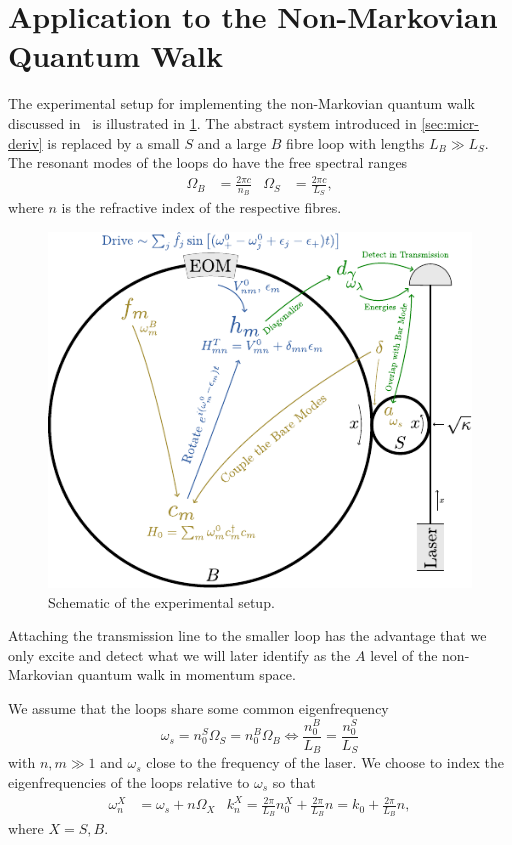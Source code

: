 \documentclass[fontsize=11pt,paper=a4,open=any,
twoside=no,toc=listof,toc=bibliography,headings=optiontohead,
captions=nooneline,captions=tableabove,english,DIV=12,numbers=noenddot,final,parskip=false,
headinclude=true,footinclude=false,BCOR=0mm]{scrartcl}
\begin{document}
\section{Application to the Non-Markovian Quantum Walk}
\label{sec:appl-non-mark}
The experimental setup for implementing the non-Markovian quantum walk
discussed in~\cite{Ricottone2020,Kitagawa2010} is illustrated in
\cref{fig:schematic}. The abstract system introduced in
\cref{sec:micr-deriv} is replaced by a small \(S\) and a large \(B\)
fibre loop with lengths \(L_{B}\gg L_{S}\). The resonant modes of the
loops do have the free spectral ranges
\begin{equation}
  \label{eq:41}
  \begin{aligned}
    Ω_{B} &= \frac{2πc}{n_{B}} & Ω_{S} &= \frac{2πc}{L_{S}},
  \end{aligned}
\end{equation}
where \(n\) is the refractive index of the respective fibres.
\begin{figure}[htp]
  \centering
  \includegraphics{walker_setup}
  \caption{\label{fig:schematic}Schematic of the experimental setup.}
\end{figure}
Attaching the transmission line to the smaller loop has the advantage
that we only excite and detect what we will later identify as the
\(A\) level of the non-Markovian quantum walk in momentum space.

We assume that the loops share some common eigenfrequency
\begin{equation}
  \label{eq:46}
  ω_{s} = n_{0}^{S}Ω_{S} = n_{0}^{B}Ω_{B}\iff \frac{n_{0}^{B}}{L_{B}}
  = \frac{n_{0}^{S}}{L_{S}}
\end{equation}
with \(n,m\gg 1\) and \(ω_{s}\) close to the frequency of the
laser. We choose to index the eigenfrequencies of the loops relative
to \(ω_{s}\) so that
\begin{equation}
  \label{eq:49}
  \begin{aligned}
    ω_{n}^{X} &= ω_{s} + n Ω_{X} & k_{n}^{X} = \frac{2π}{L_{B}}
                                   n_{0}^{X} + \frac{2π}{L_{B}} n = k_{0} + \frac{2π}{L_{B}} n,
  \end{aligned}
\end{equation}
where \(X=S,B\).
\end{document}
